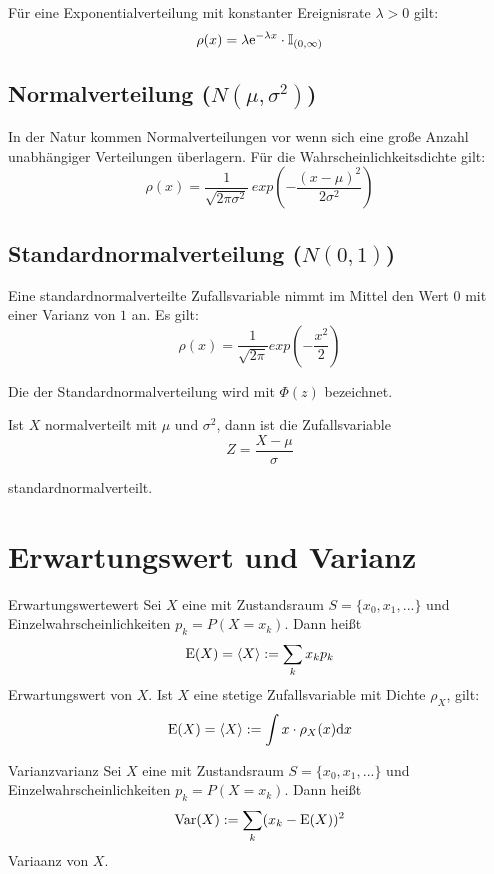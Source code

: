 Für eine Exponentialverteilung mit konstanter Ereignisrate $\lambda>0$ gilt:
\[\rho(x) = \lambda \mathrm{e}^{-\lambda x}\cdot\mathbb{I}_{(0, \infty)}\]

\subsection{Normalverteilung ($N(\mu, \sigma^2)$)}

In der Natur kommen Normalverteilungen vor wenn sich eine große Anzahl
unabhängiger Verteilungen überlagern. Für die Wahrscheinlichkeitsdichte gilt:
\[\rho(x) = \frac{1}{\sqrt{2\pi\sigma^2}}\,exp(-\frac{(x-\mu)^2}{2\sigma^2})\]


\subsection{Standardnormalverteilung ($N(0,1)$)}

Eine standardnormalverteilte Zufallsvariable nimmt im Mittel den Wert $0$ mit
einer Varianz von $1$ an. Es gilt:
\[\rho(x) = \frac{1}{\sqrt{2\pi}}exp(-\frac{x^2}{2})\]

Die  der Standardnormalverteilung wird mit $\Phi(z)$ bezeichnet.

Ist $X$ normalverteilt mit $\mu$ und $\sigma^2$, dann ist die Zufallsvariable
\[Z=\frac{X-\mu}{\sigma}\]

standardnormalverteilt.

\section{Erwartungswert und Varianz}

\begin{definition}{Erwartungswert}{ewert}
Sei $X$ eine  mit Zustandsraum $S=\{x_0, x_1,
...\}$ und Einzelwahrscheinlichkeiten $p_k=P(X=x_k)$. Dann heißt
\[\operatorname{E}(X) =\langle X\rangle := \sum_k x_kp_k\]
Erwartungswert von $X$. Ist $X$ eine stetige Zufallsvariable mit Dichte
$\rho_X$, gilt:
\[\operatorname{E}(X) =\langle X\rangle := \int x\cdot\rho_X(x)\mathrm{d}x\]
\end{definition}

\begin{definition}{Varianz}{varianz}
Sei $X$ eine  mit Zustandsraum $S=\{x_0, x_1,
...\}$ und Einzelwahrscheinlichkeiten $p_k=P(X=x_k)$. Dann heißt
\[\operatorname{Var}(X) := \sum_k (x_k - \operatorname{E}(X))^2\]
Variaanz von $X$.
\end{definition}

